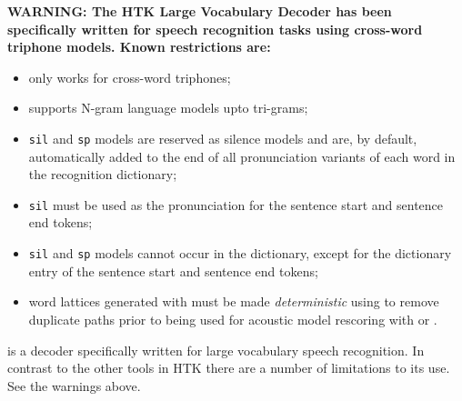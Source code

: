
%
%
\newpage
{}

{\bf\large
WARNING: The HTK Large Vocabulary
Decoder  has
been specifically written for speech recognition tasks
using cross-word triphone models. Known restrictions are:
\begin{itemize}
\item only works for cross-word triphones;
\item supports N-gram language models upto tri-grams;
\item \texttt{sil} and \texttt{sp} models are reserved as silence
models and are, by default, automatically added to the end of all
pronunciation variants of each word in the recognition dictionary;
\item  \texttt{sil} must be used as the pronunciation for the sentence start
  and sentence end tokens;
\item \texttt{sil} and \texttt{sp} models cannot occur in the dictionary,
  except for the dictionary entry of the sentence start
  and sentence end tokens;
\item word lattices generated with  must be made {\em
deterministic} using  to remove duplicate paths
prior to being used for acoustic model rescoring
with  or .
\end{itemize}
}



 is a decoder specifically written for large vocabulary
speech recognition. In contrast to the other tools in HTK there are a number
of limitations to its use. See the warnings above.

